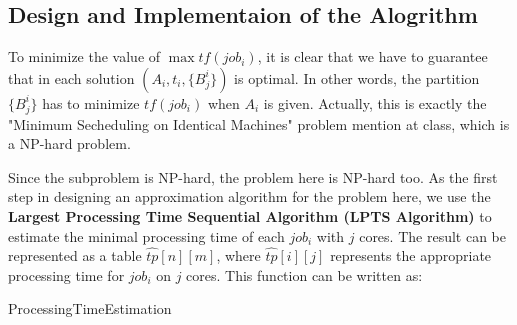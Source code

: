 \documentclass{llncs}
\begin{document}
\subsection{Design and Implementaion of the Alogrithm}\label{subsec-algo1}
  To minimize the value of $\max tf(job_i) $, it is clear that we have to guarantee that in each solution $(A_i,t_i,\{B_j^i\})$ is optimal. In other words, the partition  $\{B_j^i\}$ has to minimize $tf(job_i)$ when $A_i$ is given. Actually, this is exactly the  "Minimum Secheduling on Identical Machines" problem mention at class, which is a NP-hard problem.

  Since the subproblem is NP-hard, the problem here is NP-hard too. As the first step in designing an approximation algorithm for the problem here, we use the \textbf{Largest Processing Time Sequential Algorithm (LPTS Algorithm)} to estimate the minimal processing time of each $job_i$ with $j$ cores. The result can be represented as a table $\hat{tp}[n][m]$, where $\hat{tp}[i][j]$ represents the appropriate processing time for $job_i$ on $j$ cores. This function can be written as:\\
  \begin{minipage}[t]{0.9\textwidth}
    \begin{algorithm}[H]
      \BlankLine
      \caption{ProcessingTimeEstimation}\label{Alg_1}
      \BlankLine
    \end{algorithm}
  \end{minipage}
\end{document}
